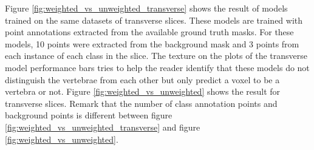 Figure \ref{fig:weighted_vs_unweighted_transverse} shows the result of models trained on the same datasets of transverse slices.
These models are trained with point annotations extracted from the available ground truth masks. For these models, 
10 points were extracted from the background mask and 3 points from each instance of each class in the slice. 
The texture on the plots of the transverse model performance bars tries to help the reader identify that these models do not distinguish the vertebrae from each other but only predict a voxel to be a vertebra or not.
Figure \ref{fig:weighted_vs_unweighted} shows the result for transverse slices.
Remark that the number of class annotation points and background points is different between figure \ref{fig:weighted_vs_unweighted_transverse} and figure \ref{fig:weighted_vs_unweighted}.


